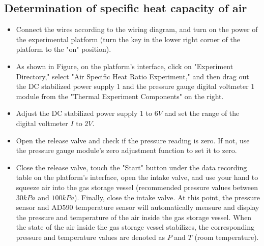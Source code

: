 \documentclass[UTF8]{article}
\begin{document}
	\subsection{Determination of specific heat capacity of air}
	\begin{itemize}
	  \item Connect the wires according to the wiring diagram, and turn on the power of the experimental platform (turn the key in the lower right corner of the platform to the "on" position).
	  \item As shown in Figure, on the platform's interface, click on "Experiment Directory," select "Air Specific Heat Ratio Experiment," and then drag out the DC stabilized power supply 1 and the pressure gauge digital voltmeter 1 module from the "Thermal Experiment Components" on the right.
	  \item Adjust the DC stabilized power supply $1$ to $6V$ and set the range of the digital voltmeter $I$ to $2V$.
	  \item Open the release valve and check if the pressure reading is zero. If not, use the pressure gauge module's zero adjustment function to set it to zero.
	  \item Close the release valve, touch the "Start" button under the data recording table on the platform's interface, open the intake valve, and use your hand to squeeze air into the gas storage vessel (recommended pressure values between $30kPa$ and $100kPa$). Finally, close the intake valve. At this point, the pressure sensor and AD590 temperature sensor will automatically measure and display the pressure and temperature of the air inside the gas storage vessel. When the state of the air inside the gas storage vessel stabilizes, the corresponding pressure and temperature values are denoted as $P$ and $T$ (room temperature).
	\end{itemize}
\end{document}
